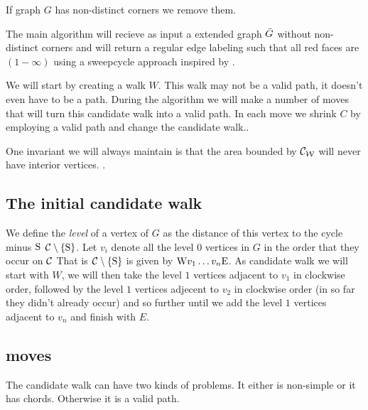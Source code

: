 If graph $G$ has non-distinct corners we remove them.


The main algorithm will recieve as input a extended graph $\bar{G}$ without non-distinct corners and will return a regular edge labeling such that all red faces are $(1-\infty)$ using a sweepcycle approach inspired by \Fusy {} \cite{F}.

We will start by creating a walk $W$. This walk may not be a valid path, it doesn't even have to be a path. During the algorithm we will make a number of moves that will turn this candidate walk into a valid path. In each move we shrink $C$ by employing a valid path and change the candidate walk..

One invariant we will always maintain is that the area bounded by $\mathcal{C}_{\mathcal{W}}$ will never have interior vertices. .

\subsection{The initial candidate walk}
We define the \emph{level} of a vertex of $G$ as the distance of this vertex to the cycle minus $\mathrm{S}$ $\mathcal{C} \setminus \left\lbrace {\mathrm{S}} \right\rbrace$. Let $v_i$ denote all the level $0$ vertices in $G$ in the order that they occur on $\mathcal{C}$  That is $\mathcal{C} \setminus \left\lbrace {\mathrm{S}} \right\rbrace$ is given by $\mathrm{W} v_1 \ldots v_n \mathrm{E}$. 
As candidate walk we will start with $W$, we will then take the level $1$ vertices adjacent to $v_1$ in clockwise order, followed by the level $1$ vertices adjecent to $v_2$ in clockwise order (in so far they didn't already occur) and so further until we add the level $1$ vertices adjacent to $v_n$ and finish with $E$.

\subsection{moves}

The candidate walk can have two kinds of problems. It either is non-simple or it has chords. Otherwise it is a valid path.



